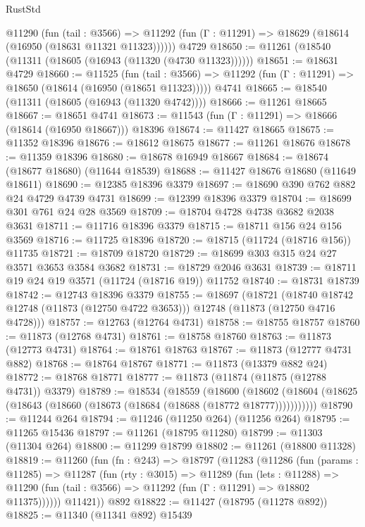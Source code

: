 \begin{lexlean}{RustStd}
\begin{coremodule}
    @11290
      (fun (tail : @3566) =>
      @11292 (fun (Γ : @11291) => @18629 (@18614 (@16950 (@18631 @11321 @11323))))))
    @4729
@18650 := @11261 (@18540 (@11311 (@18605 (@16943 (@11320 (@4730 @11323))))))
@18651 := @18631 @4729
@18660 := @11525
    (fun (tail : @3566) => @11292 (fun (Γ : @11291) => @18650 (@18614 (@16950 (@18651 @11323)))))
    @4741
@18665 := @18540 (@11311 (@18605 (@16943 (@11320 @4742))))
@18666 := @11261 @18665
@18667 := @18651 @4741
@18673 := @11543 (fun (Γ : @11291) => @18666 (@18614 (@16950 @18667))) @18396
@18674 := @11427 @18665
@18675 := @11352 @18396
@18676 := @18612 @18675
@18677 := @11261 @18676
@18678 := @11359 @18396
@18680 := @18678 @16949 @18667
@18684 := @18674 (@18677 @18680) (@11644 @18539)
@18688 := @11427 @18676 @18680 (@11649 @18611)
@18690 := @12385 @18396 @3379
@18697 := @18690 @390 @762 @882 @24 @4729 @4739 @4731
@18699 := @12399 @18396 @3379
@18704 := @18699 @301 @761 @24 @28 @3569
@18709 := @18704 @4728 @4738 @3682 @2038 @3631
@18711 := @11716 @18396 @3379
@18715 := @18711 @156 @24 @156 @3569
@18716 := @11725 @18396
@18720 := @18715 (@11724 (@18716 @156)) @11735
@18721 := @18709 @18720
@18729 := @18699 @303 @315 @24 @27 @3571 @3653 @3584 @3682
@18731 := @18729 @2046 @3631
@18739 := @18711 @19 @24 @19 @3571 (@11724 (@18716 @19)) @11752
@18740 := @18731 @18739
@18742 := @12743 @18396 @3379
@18755 := @18697
    (@18721
      (@18740 @18742 @12748 (@11873 (@12750 @4722 @3653)))
      @12748
      (@11873 (@12750 @4716 @4728)))
@18757 := @12763 (@12764 @4731)
@18758 := @18755 @18757
@18760 := @11873 (@12768 @4731)
@18761 := @18758 @18760
@18763 := @11873 (@12773 @4731)
@18764 := @18761 @18763
@18767 := @11873 (@12777 @4731 @882)
@18768 := @18764 @18767
@18771 := @11873 (@13379 @882 @24)
@18772 := @18768 @18771
@18777 := @11873 (@11874 (@11875 (@12788 @4731)) @3379)
@18789 := @18534
    (@18559
      (@18600
        (@18602 (@18604 (@18625 (@18643 (@18660 (@18673 (@18684 (@18688 (@18772 @18777)))))))))))
@18790 := @11244 @264
@18794 := @11246 (@11250 @264) (@11256 @264)
@18795 := @11265 @15436
@18797 := @11261 (@18795 @11280)
@18799 := @11303 (@11304 @264)
@18800 := @11299 @18799
@18802 := @11261 (@18800 @11328)
@18819 := @11260
    (fun (fn : @243) =>
    @18797
      (@11283
        (@11286
          (fun (params : @11285) =>
          @11287
            (fun (rty : @3015) =>
            @11289
              (fun (lets : @11288) =>
              @11290 (fun (tail : @3566) => @11292 (fun (Γ : @11291) => @18802 @11375))))))
        @11421))
    @892
@18822 := @11427 (@18795 (@11278 @892))
@18825 := @11340 (@11341 @892) @15439

\end{coremodule}
\end{lexlean}
